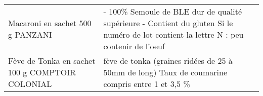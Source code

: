 \begin{longtable}{p{5cm}p{10cm}}
                                                                         Macaroni en sachet 500 g PANZANI &                                                                                                                                                                                                                                                                                                                                                                                                                                                                                                                                                                                                                                                                                                                                                                                                                                                                                                 - 100\% Semoule de BLE dur de qualité supérieure  - Contient du gluten  Si le numéro de lot contient la lettre N : peu contenir de l'oeuf \\
                                                          Fève de Tonka en sachet 100 g COMPTOIR COLONIAL &                                                                                                                                                                                                                                                                                                                                                                                                                                                                                                                                                                                                                                                                                                                                                                                                                                                                                                                                          fève de tonka (graines ridées de 25 à 50mm de long)  Taux de coumarine compris entre 1 et 3,5 \% \\

\end{longtable}
